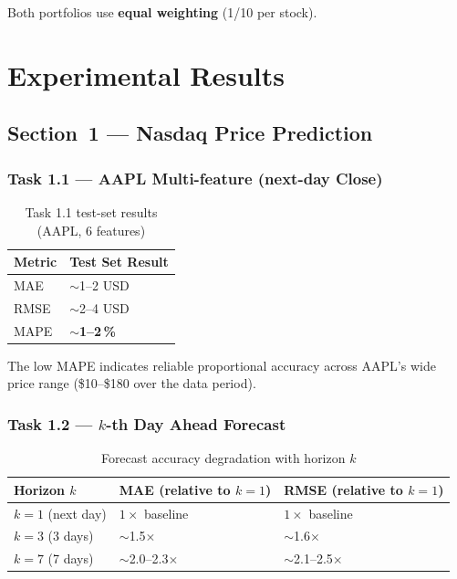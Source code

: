 \documentclass[12pt,a4paper]{article}
\begin{document}
Both portfolios use \textbf{equal weighting} (1/10 per stock).

\section{Experimental Results}

\subsection{Section~1 --- Nasdaq Price Prediction}

\subsubsection{Task 1.1 --- AAPL Multi-feature (next-day Close)}

\begin{table}[H]
\centering
\caption{Task 1.1 test-set results (AAPL, 6 features)}
\begin{tabular}{ll}
\toprule
\textbf{Metric} & \textbf{Test Set Result} \\
\midrule
MAE  & $\sim$1--2 USD \\
RMSE & $\sim$2--4 USD \\
MAPE & \textbf{$\sim$1--2\,\%} \\
\bottomrule
\end{tabular}
\end{table}

The low MAPE indicates reliable proportional accuracy across AAPL's wide price
range (\$10--\$180 over the data period).

\subsubsection{Task 1.2 --- $k$-th Day Ahead Forecast}

\begin{table}[H]
\centering
\caption{Forecast accuracy degradation with horizon $k$}
\begin{tabular}{lll}
\toprule
\textbf{Horizon $k$} & \textbf{MAE (relative to $k=1$)} & \textbf{RMSE (relative to $k=1$)} \\
\midrule
$k=1$ (next day)   & $1\times$ baseline & $1\times$ baseline \\
$k=3$ (3 days)     & $\sim$1.5$\times$  & $\sim$1.6$\times$ \\
$k=7$ (7 days)     & $\sim$2.0--2.3$\times$ & $\sim$2.1--2.5$\times$ \\
\bottomrule
\end{tabular}
\end{table}
\end{document}
